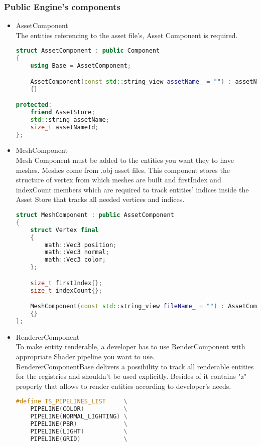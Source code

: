 \subsubsection{Public Engine's components}
\begin{itemize}
    \item AssetComponent\\
    The entities referencing to the asset file's, Asset Component is required.
\begin{lstlisting}[language=c++, caption= Asset Component struct(./engine/include/tsengine/ecs/components/asset\_component.h)]
struct AssetComponent : public Component
{
    using Base = AssetComponent;

    AssetComponent(const std::string_view assetName_ = "") : assetName{assetName_}, assetNameId{std::hash<std::string_view>{}(assetName_)}
    {}

protected:
    friend AssetStore;
    std::string assetName;
    size_t assetNameId;
};
\end{lstlisting}
    \item MeshComponent\\
    Mesh Component must be added to the entities you want they to have meshes.
    Meshes come from .obj asset files.
    This component stores the structure of vertex from which meshes are built and firstIndex and indexCount members which are required to track entities' indices inside the Asset Store that tracks all needed vertices and indices. 
\begin{lstlisting}[language=c++, caption= Mesh Component struct (./engine/include/tsengine/ecs/components/mesh\_component.h)]
struct MeshComponent : public AssetComponent
{
    struct Vertex final
    {
        math::Vec3 position;
        math::Vec3 normal;
        math::Vec3 color;
    };

    size_t firstIndex{};
    size_t indexCount{};

    MeshComponent(const std::string_view fileName_ = "") : AssetComponent{fileName_}
    {}
};
\end{lstlisting}
    \item RendererComponent\\
    \label{sec:render_component}
    To make entity renderable, a developer has to use RenderComponent with appropriate Shader pipeline you want to use.\\
    RendererComponentBase delivers a possibility to track all renderable entities for the registries and shouldn't be used explicitly. Besides of it contains "z" property that allows to render entities according to developer's needs. 
\begin{lstlisting}[language=c++, caption=Renderer Component struct (./engine/include/tsengine/ecs/components/renderer\_component.h)]
#define TS_PIPELINES_LIST     \
    PIPELINE(COLOR)           \
    PIPELINE(NORMAL_LIGHTING) \
    PIPELINE(PBR)             \
    PIPELINE(LIGHT)           \
    PIPELINE(GRID)            \



\end{lstlisting}
\end{itemize}
